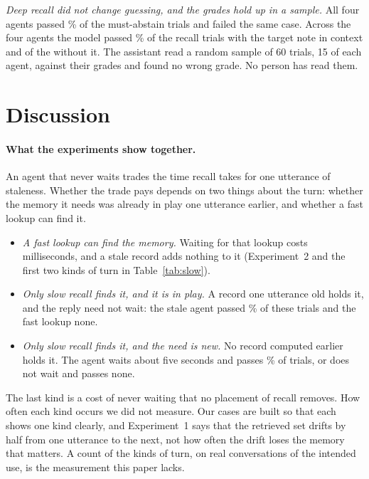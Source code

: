 \documentclass[10pt]{article}
\begin{document}
\emph{Deep recall did not change guessing, and the grades hold up in a sample.} All four agents passed \SAbstFast\% of the must-abstain trials and failed the same case. Across the four agents the model passed \SPassGivenGold\% of the \SPassGivenGoldN{} recall trials with the target note in context and \SNoGoldPassed{} of the \SNoGoldN{} without it. The assistant read a random sample of 60 trials, 15 of each agent, against their grades and found no wrong grade. No person has read them.

\section{Discussion}
\label{sec:discussion}

\paragraph{What the experiments show together.} An agent that never waits trades the time recall takes for one utterance of staleness. Whether the trade pays depends on two things about the turn: whether the memory it needs was already in play one utterance earlier, and whether a fast lookup can find it.

\begin{itemize}[leftmargin=*,itemsep=1pt,topsep=3pt]
\item \emph{A fast lookup can find the memory.} Waiting for that lookup costs milliseconds, and a stale record adds nothing to it (Experiment~2 and the first two kinds of turn in Table~\ref{tab:slow}).
\item \emph{Only slow recall finds it, and it is in play.} A record one utterance old holds it, and the reply need not wait: the stale agent passed \SStaleC\% of these trials and the fast lookup none.
\item \emph{Only slow recall finds it, and the need is new.} No record computed earlier holds it. The agent waits about five seconds and passes \SDeepD\% of trials, or does not wait and passes none.
\end{itemize}

The last kind is a cost of never waiting that no placement of recall removes. How often each kind occurs we did not measure. Our cases are built so that each shows one kind clearly, and Experiment~1 says that the retrieved set drifts by half from one utterance to the next, not how often the drift loses the memory that matters. A count of the kinds of turn, on real conversations of the intended use, is the measurement this paper lacks.
\end{document}
